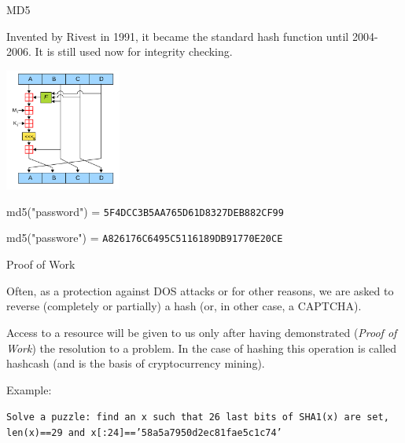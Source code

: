 \documentclass[handout, xcolor=dvipsnames,aspectratio=169]{beamer}
\begin{document}
\begin{frame}{MD5}
  
    \pause
    Invented by Rivest in 1991, it became the standard hash function until 2004-2006.
    It is still used now for integrity checking.

    \pause
  \medskip
  
  \centering
  {
  \includegraphics[width=3.8cm]{img/md5}
  }
  
    \pause
  md5("password") = \texttt{5F4DCC3B5AA765D61D8327DEB882CF99}
  
    \pause
  md5("passwore") = \texttt{A826176C6495C5116189DB91770E20CE}
  
\end{frame}

\begin{frame}{Proof of Work}
    \pause

    Often, as a protection against DOS attacks or for other reasons, we are asked to reverse (completely or partially) a hash (or, in other case, a CAPTCHA).

    \pause \medskip
        
    Access to a resource will be given to us only after having demonstrated (\textit{Proof of Work}) the resolution to a problem.
    In the case of hashing this operation is called hashcash (and is the basis of cryptocurrency mining).
    
    \medskip
    
    \pause

    Example:
    
    \texttt{Solve a puzzle: find an x such that 26 last bits of SHA1(x) are set, len(x)==29 and x[:24]=='58a5a7950d2ec81fae5c1c74'}
    
\end{frame}
\end{document}
